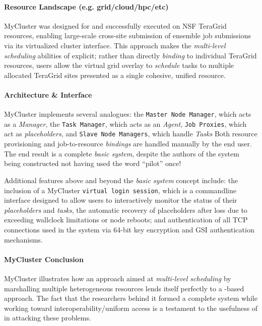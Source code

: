 \documentclass{sig-alternate}
\begin{document}
\paragraph{Resource Landscape (e.g. grid/cloud/hpc/etc)}
MyCluster was designed for and successfully executed on NSF TeraGrid
resources, enabling large-scale cross-site submission of ensemble
job submissions via its virtualized cluster interface.
This approach makes the \textit{multi-level scheduling} abilities
of \pilotjobs explicit; rather than directly \textit{binding}
to individual TeraGrid resources, users allow the virtual grid
overlay to \textit{schedule} tasks to multiple allocated TeraGrid sites
presented as a single cohesive, unified resource.

\paragraph{Architecture \& Interface}
MyCluster implements several \pilotjob analogues: the \texttt{Master
  Node Manager}, which acts as a \textit{\pilotjob Manager}, the
\texttt{Task Manager}, which acts as an \textit{\pilotjob Agent},
\texttt{Job Proxies}, which act as \textit{placeholders}, and
\texttt{Slave Node Managers}, which handle \textit{\pilotjob Tasks}
Both resource provisioning and job-to-resource \textit{bindings}
are handled manually by the end user.
The end result is a complete \textit{basic \pilotjob system}, despite the
authors of the system being constructed not having used the word ``pilot''
once!~\cite{1652061}

Additional features above and beyond the \textit{basic \pilotjob system}
concept include: the inclusion of a MyCluster
\texttt{virtual login session}, which
is a commandline interface designed to allow users to interactively
monitor the status of their \textit{placeholders} and \textit{tasks},
the automatic recovery of placeholders after loss due to exceeding wallclock
limitations or node reboots; and authentication of all TCP
connections used in the system via 64-bit key encryption and
GSI authentication mechanisms.

\paragraph{MyCluster Conclusion}
MyCluster illustrates how an approach aimed at \textit{multi-level
scheduling} by marshalling multiple heterogeneous resources lends
itself perfectly to a \pilotjob-based approach.  The fact that
the researchers behind it formed a complete \pilotjob system
while working toward interoperability/uniform access is a testament
to the usefulness of \pilotjobs in attacking these problems.
\end{document}

